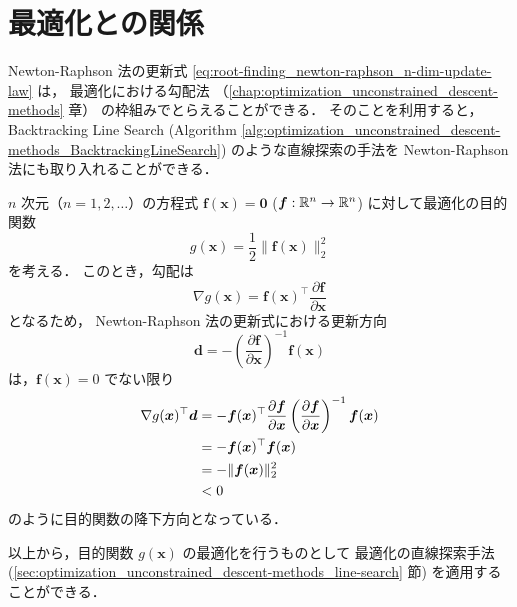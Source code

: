 \section{最適化との関係}

Newton-Raphson 法の更新式
\eqref{eq:root-finding_newton-raphson_n-dim-update-law} は，
最適化における勾配法
（\ref{chap:optimization_unconstrained_descent-methods} 章）
の枠組みでとらえることができる．
そのことを利用すると，
Backtracking Line Search
(Algorithm \ref{alg:optimization_unconstrained_descent-methods_BacktrackingLineSearch})
のような直線探索の手法を Newton-Raphson 法にも取り入れることができる．

$n$ 次元（$n=1,2,\ldots$）の方程式
$\bm{f}(\bm{x}) = \bm{0}$ ($\bm{f}: \mathbb{R}^n \to \mathbb{R}^n$)
に対して最適化の目的関数
\begin{equation}
    g(\bm{x}) = \frac{1}{2} \| \bm{f}(\bm{x}) \|_2^2
\end{equation}
を考える．
このとき，勾配は
\begin{equation}
    \nabla g(\bm{x}) = \bm{f}(\bm{x})^\top \frac{\partial \bm{f}}{\partial \bm{x}}
\end{equation}
となるため，
Newton-Raphson 法の更新式における更新方向
\begin{equation}
    \bm{d} = - \left(\frac{\partial \bm{f}}{\partial \bm{x}}\right)^{-1} \bm{f}(\bm{x})
\end{equation}
は，$\bm{f}(\bm{x}) = 0$ でない限り
\begin{align}
    \nabla g(\bm{x})^\top \bm{d}
     & = - \bm{f}(\bm{x})^\top \frac{\partial \bm{f}}{\partial \bm{x}}
    \left(\frac{\partial \bm{f}}{\partial \bm{x}}\right)^{-1} \bm{f}(\bm{x})
    \notag                                                             \\
     & = - \bm{f}(\bm{x})^\top \bm{f}(\bm{x})
    \notag                                                             \\
     & = - \| \bm{f}(\bm{x}) \|_2^2
    \notag                                                             \\
     & < 0
\end{align}
のように目的関数の降下方向となっている．

以上から，目的関数 $g(\bm{x})$ の最適化を行うものとして
最適化の直線探索手法
(\ref{sec:optimization_unconstrained_descent-methods_line-search} 節)
を適用することができる．
